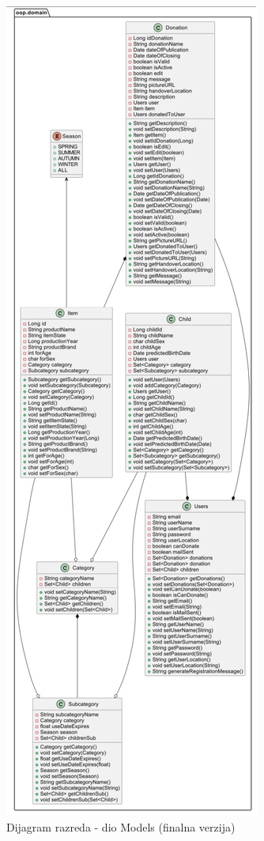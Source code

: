                 \begin{figure}[H]
				\includegraphics[width=\textwidth,height=0.95\textheight]{dijagrami/Modeli Final.png}
				\centering
				\caption{Dijagram razreda - dio Models (finalna verzija)}
				\label{fig:ModelsFinal}
			\end{figure}

